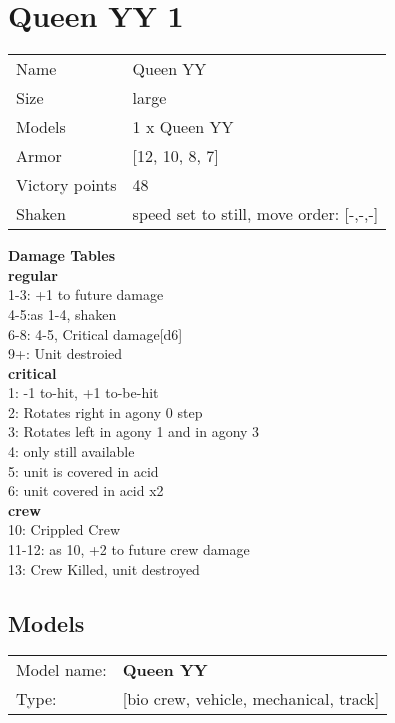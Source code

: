 \clearpage

\section{ Queen YY 1 }

\begin{tabular}{ll}
  Name & Queen YY \\
  Size & large\\
  Models & 1 x Queen YY\\
  Armor & [12, 10, 8, 7]\\
  Victory points & 48\\
  Shaken & speed set to still, move order: [-,-,-]\\
\end{tabular}




{\bf Damage Tables} \\
 {\bf regular } \\
1-3: +1 to future damage \\
4-5:as 1-4, shaken \\
6-8: 4-5, Critical damage[d6] \\
9+: Unit destroied \\
 {\bf critical } \\
1: -1 to-hit, +1 to-be-hit \\
2: Rotates right in agony 0 step \\
3: Rotates left in agony 1 and in agony 3 \\
4: only still available \\
5: unit is covered in acid \\
6: unit covered in acid x2 \\
 {\bf crew } \\
10: Crippled Crew \\
11-12: as 10, +2 to future crew damage \\
13: Crew Killed, unit destroyed \\


\clearpage

\subsection{ Models }

\begin{tabular}{ll}
Model name: & {\bf Queen YY } \\
Type: & [bio crew, vehicle, mechanical, track] \\
\end{tabular}

